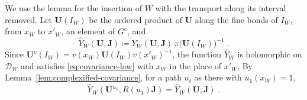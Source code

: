\documentclass[11pt]{preprint}
\numberwithin{equation}{section}
\theoremstyle{definition}
\theoremstyle{remark}
\theoremstyle{plain}
\begin{document}
We use the lemma for the insertion of $W$ with the transport along its interval removed. Let $\mathbf U(I_W)$ be the ordered product of $\mathbf U$ along the fine bonds of $I_W$, from $x_W$ to $x'_W$, an element of $G^c$, and
\begin{equation}\label{eq:base-point-form}
    \hat Y_W(\mathbf U, \mathbf J) \coloneqq Y_W(\mathbf U, \mathbf J)\,\pi\bigl(\mathbf U(I_W)\bigr)^{-1}\;.
\end{equation}
Since $\mathbf U^v(I_W) = v(x_W)\mathbf U(I_W)v(x'_W)^{-1}$, the function $\hat Y_W$ is holomorphic on $\mathcal D_W$ and satisfies \eqref{eq:covariance-law} with $x_W$ in the place of $x'_W$. By Lemma~\ref{lem:complexified-covariance}, for a path $u_t$ as there with $u_1(x_W) = 1$,
\begin{equation}\label{eq:base-point-invariance}
    \hat Y_W(\mathbf U^{u_1}, R(u_1)\mathbf J) = \hat Y_W(\mathbf U, \mathbf J)\;.
\end{equation}
\end{document}

